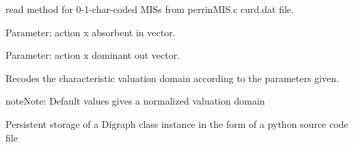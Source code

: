 \documentclass[letterpaper,10pt,english]{sphinxmanual}
\begin{document}
\begin{fulllineitems}
\begin{fulllineitems}
\end{fulllineitems}


\begin{fulllineitems}
\label{techDoc:digraphs.Digraph.readPerrinMissetOpt}
read method for 0-1-char-coded MISs from perrinMIS.c curd.dat file.

\end{fulllineitems}


\begin{fulllineitems}
\label{techDoc:digraphs.Digraph.readabsvector}
Parameter: action x
absorbent in vector.

\end{fulllineitems}


\begin{fulllineitems}
\label{techDoc:digraphs.Digraph.readdomvector}
Parameter: action x
dominant out vector.

\end{fulllineitems}


\begin{fulllineitems}
\label{techDoc:digraphs.Digraph.recodeValuation}
Recodes the characteristic valuation domain according
to the parameters given.

\begin{notice}{note}{Note:}
Default values gives a normalized valuation domain
\end{notice}

\end{fulllineitems}


\begin{fulllineitems}
\label{techDoc:digraphs.Digraph.save}
Persistent storage of a Digraph class instance in the form of
a python source code file


\end{fulllineitems}
\end{fulllineitems}
\end{document}

